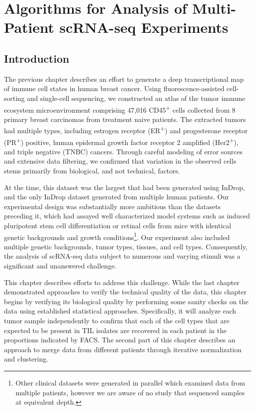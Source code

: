 
\chapter[Algorithms for Analysis of Multi-Patient scRNA-seq Experiments][Algorithms for Analysis of Multi-Patient scRNA-seq Experiments]{Algorithms for Analysis of Multi-Patient scRNA-seq Experiments}

\section{Introduction}

The previous chapter describes an effort to generate a deep transcriptional map of immune cell states in human breast cancer.
Using fluorescence-assisted cell-sorting and single-cell sequencing, we constructed an atlas of the tumor immune ecosystem microenvironment comprising 47,016 CD45\textsuperscript{+} cells collected from 8 primary breast carcinomas from treatment naive patients. 
The extracted tumors had multiple types, including estrogen receptor (ER\textsuperscript{+}) and progesterone receptor (PR\textsuperscript{+}) positive, human epidermal growth factor receptor 2 amplified (Her2\textsuperscript{+}), and triple negative (TNBC) cancers. 
Through careful modeling of error sources and extensive data filtering, we confirmed that variation in the observed cells stems primarily from biological, and not technical, factors.

At the time, this dataset was the largest that had been generated using InDrop, and the only InDrop dataset generated from multiple human patients.
Our experimental design was substantially more ambitious than the datasets preceding it, which had assayed well characterized model systems such as induced pluripotent stem cell differentiation \citep{Klein2015} or retinal cells \citep{Macosko2015} from mice with identical genetic backgrounds and growth conditions\footnote{Other clinical datasets were generated in parallel which examined data from multiple patients\citep{Tirosh2016}, however we are aware of no study that sequenced samples at equivalent depth.}. 
Our experiment also included multiple genetic backgrounds, tumor types, tissues, and cell types. 
Consequently, the analysis of scRNA-seq data subject to numerous and varying stimuli was a significant and unanswered challenge.  

This chapter describes efforts to address this challenge.
While the last chapter demonstrated approaches to verify the technical quality of the data, this chapter begins by verifying its biological quality by performing some sanity checks on the data using established statistical approaches. 
Specifically, it will analyze each tumor sample independently to confirm that each of the cell types that are expected to be present in TIL isolates are recovered in each patient in the proportions indicated by FACS\@.
The second part of this chapter describes an approach to merge data from different patients through iterative normalization and clustering. 
 
